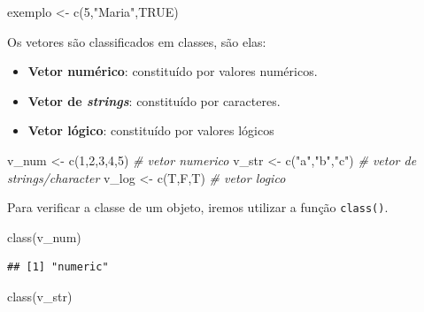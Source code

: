 \documentclass[
]{book}
\newenvironment{Shaded}{\begin{snugshade}}{\end{snugshade}}
\newcommand{\CommentTok}[1]{\textcolor[rgb]{0.56,0.35,0.01}{\textit{#1}}}
\newcommand{\ConstantTok}[1]{\textcolor[rgb]{0.00,0.00,0.00}{#1}}
\newcommand{\DecValTok}[1]{\textcolor[rgb]{0.00,0.00,0.81}{#1}}
\newcommand{\FunctionTok}[1]{\textcolor[rgb]{0.00,0.00,0.00}{#1}}
\newcommand{\NormalTok}[1]{#1}
\newcommand{\OtherTok}[1]{\textcolor[rgb]{0.56,0.35,0.01}{#1}}
\newcommand{\StringTok}[1]{\textcolor[rgb]{0.31,0.60,0.02}{#1}}
\providecommand{\tightlist}{%
  \setlength{\itemsep}{0pt}\setlength{\parskip}{0pt}}
\begin{document}
\begin{Shaded}
\begin{Highlighting}[]
\NormalTok{exemplo }\OtherTok{\textless{}{-}} \FunctionTok{c}\NormalTok{(}\DecValTok{5}\NormalTok{,}\StringTok{"Maria"}\NormalTok{,}\ConstantTok{TRUE}\NormalTok{)}
\end{Highlighting}
\end{Shaded}

Os vetores são classificados em classes, são elas:

\begin{itemize}
\tightlist
\item
  \textbf{Vetor numérico}: constituído por valores numéricos.
\item
  \textbf{Vetor de \emph{strings}}: constituído por caracteres.
\item
  \textbf{Vetor lógico}: constituído por valores lógicos
\end{itemize}

\begin{Shaded}
\begin{Highlighting}[]
\NormalTok{v\_num }\OtherTok{\textless{}{-}} \FunctionTok{c}\NormalTok{(}\DecValTok{1}\NormalTok{,}\DecValTok{2}\NormalTok{,}\DecValTok{3}\NormalTok{,}\DecValTok{4}\NormalTok{,}\DecValTok{5}\NormalTok{)   }\CommentTok{\# vetor numerico}
\NormalTok{v\_str }\OtherTok{\textless{}{-}} \FunctionTok{c}\NormalTok{(}\StringTok{"a"}\NormalTok{,}\StringTok{"b"}\NormalTok{,}\StringTok{"c"}\NormalTok{) }\CommentTok{\# vetor de strings/character}
\NormalTok{v\_log }\OtherTok{\textless{}{-}} \FunctionTok{c}\NormalTok{(T,F,T)       }\CommentTok{\# vetor logico}
\end{Highlighting}
\end{Shaded}

Para verificar a classe de um objeto, iremos utilizar a função \texttt{class()}.

\begin{Shaded}
\begin{Highlighting}[]
\FunctionTok{class}\NormalTok{(v\_num)}
\end{Highlighting}
\end{Shaded}

\begin{verbatim}
## [1] "numeric"
\end{verbatim}

\begin{Shaded}
\begin{Highlighting}[]
\FunctionTok{class}\NormalTok{(v\_str)}
\end{Highlighting}
\end{Shaded}
\end{document}
